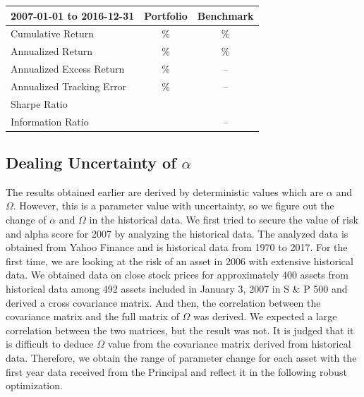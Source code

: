 \documentclass[11pt]{article}
\begin{document}
	\begin{table}[htbp]
		\def\arraystretch{1.4}
		\begin{center}
			\begin{tabular}{|l|c|c|}
				\hline
				\textbf{2007-01-01 to 2016-12-31}& 
				\textbf{Portfolio}& 
				\textbf{Benchmark} \\
				\hline
				Cumulative Return& 
				{\%}& 
				{\%} \\
				\hline
				Annualized Return& 
				{\%}& 
				{\%} \\
				\hline
				Annualized Excess Return& 
				{\%}& 
				-- \\
				\hline
				Annualized Tracking Error& 
				{\%}& 
				-- \\
				\hline
				Sharpe Ratio& 
				& 
				\\
				\hline
				Information Ratio& 
				& 
				-- \\
				\hline
			\end{tabular}
			\label{tab1}
		\end{center}
	\end{table}
	
	
	\subsection{Dealing Uncertainty of $\alpha$} 
	
	The results obtained earlier are derived by deterministic values which are $\alpha$ and $\Omega$. However, this is a parameter value with uncertainty, so we figure out the change of $\alpha$ and $\Omega$ in the historical data.  We first tried to secure the value of risk and alpha score for 2007 by analyzing the historical data. The analyzed data is obtained from Yahoo Finance and is historical data from 1970 to 2017. For the first time, we are looking at the risk of an asset in 2006 with extensive historical data. We obtained data on close stock prices for approximately 400 assets from historical data among 492 assets included in January 3, 2007 in S \& P 500 and derived a cross covariance matrix. And then, the correlation between the covariance matrix and the full matrix of $\Omega$ was derived. We expected a large correlation between the two matrices, but the result was not. It is judged that it is difficult to deduce $\Omega$ value from the covariance matrix derived from historical data. Therefore, we obtain the range of parameter change for each asset with the first year data received from the Principal and reflect it in the following robust optimization. %
	
\end{document}
